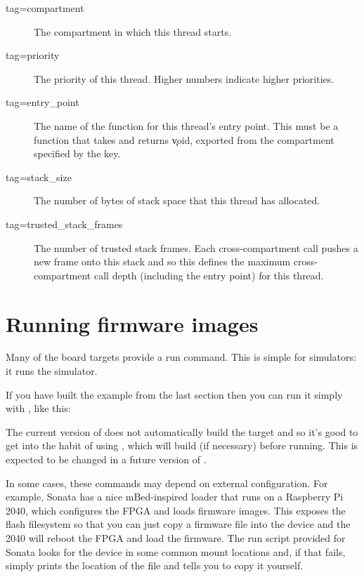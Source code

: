 \begin{description}
	\item[tag=compartment]{ The compartment in which this thread starts.}
	\item[tag=priority]{ The priority of this thread.
		Higher numbers indicate higher priorities.}
	\item[tag=entry_point]{ The name of the function for this thread's entry point.
		This must be a function that takes and returns \c{void}, exported from the compartment specified by the  key.}
	\item[tag=stack_size]{ The number of bytes of stack space that this thread has allocated.}
	\item[tag=trusted_stack_frames]{ The number of trusted stack frames.
		Each cross-compartment call pushes a new frame onto this stack and so this defines the maximum cross-compartment call depth (including the entry point) for this thread.}
\end{description}

\section{Running firmware images}

Many of the board targets provide a run command.
This is simple for simulators: it runs the simulator.

If you have built the example from the last section then you can run it simply with , like this:


\begin{note}
	The current version of  does not automatically build the target and so it's good to get into the habit of using , which will build (if necessary) before running.
	This is expected to be changed in a future version of .
\end{note}

In some cases, these commands may depend on external configuration.
For example, Sonata has a nice mBed-inspired loader that runs on a Raspberry Pi 2040, which configures the FPGA and loads firmware images.
This exposes the flash filesystem so that you can just copy a firmware file into the  device and the 2040 will reboot the FPGA and load the firmware.
The run script provided for Sonata looks for the  device in some common mount locations and, if that fails, simply prints the location of the file and tells you to copy it yourself.

